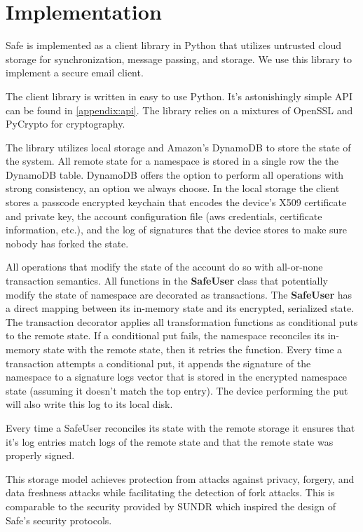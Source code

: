 \setcounter{secnumdepth}{4}

\section{Implementation}

Safe is implemented as a client library in Python that utilizes untrusted cloud storage for synchronization, message passing, and storage. We use this library to implement a secure email client.

The client library is written in easy to use Python. 
It's astonishingly simple API can be found in \ref{appendix:api}.
The library relies on a mixtures of OpenSSL \cite{openssl} and PyCrypto \cite{pycrypto} for cryptography.

The library utilizes local storage and Amazon's DynamoDB to store the state of the system.
All remote state for a namespace is stored in a single row the the DynamoDB table.
DynamoDB offers the option to perform all operations with strong consistency, an option we always choose.
In the local storage the client stores a passcode encrypted keychain that encodes the device's X509 certificate and private key, the account configuration file (aws credentials, certificate information, etc.), and the log of signatures that the device stores to make sure nobody has forked the state.

All operations that modify the state of the account do so with all-or-none transaction semantics.
All functions in the \textbf{SafeUser} class that potentially modify the state of namespace are decorated as transactions. 
The \textbf{SafeUser} has a direct mapping between its in-memory state and its encrypted, serialized state. 
The transaction decorator applies all transformation functions as conditional puts to the remote state. 
If a conditional put fails, the namespace reconciles its in-memory state with the remote state, then it retries the function.
Every time a transaction attempts a conditional put, it appends the signature of the namespace to a signature logs vector that is stored in the encrypted namespace state (assuming it doesn't match the top entry). 
The device performing the put will also write this log to its local disk.

Every time a SafeUser reconciles its state with the remote storage it ensures that it's log entries match logs of the remote state and that the remote state was properly signed.

This storage model achieves protection from attacks against privacy, forgery, and data freshness attacks while facilitating the detection of fork attacks. This is comparable to the security provided by SUNDR \cite{sundr} which inspired the design of Safe's security protocols.

